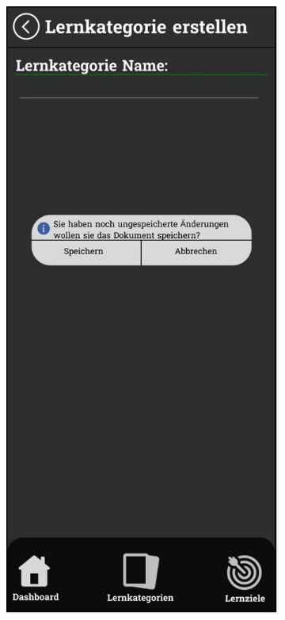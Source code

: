 \newpage

\begin{figure}[htbp]
  \centering
  \begin{subfigure}[b]{0.45\linewidth}
    \centering
    \includegraphics[width=\linewidth]{images/Mockups/createLernkategorie.JPG}

\end{subfigure}
\end{figure}
